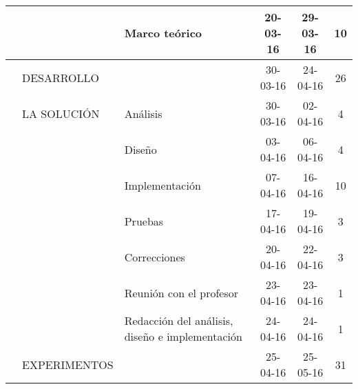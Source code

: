 \begin{table}[H]
{\begin{tabular}{lllccc}
     &				& Marco teórico				& 20-03-16	& 29-03-16	& 10\\\hline
	 & DESARROLLO	&	& 30-03-16	& 24-04-16	& 26\\
     & LA SOLUCIÓN                             & Análisis                                           & 30-03-16                                                           & 02-04-16                                                            & 4                                                                  \\
     &                              & Diseño                                             & 03-04-16                                                           & 06-04-16                                                            & 4                                                                  \\
     &                              & Implementación                                     & 07-04-16                                                           & 16-04-16                                                            & 10                                                                 \\
     &                              & Pruebas                                            & 17-04-16                                                           & 19-04-16                                                            & 3                                                                  \\
     &                               & Correcciones                                       & 20-04-16                                                           & 22-04-16                                                            & 3                                                                  \\
     &                               & Reunión con el profesor                            & 23-04-16                                                           & 23-04-16                                                            & 1                                                                  \\
     &                               & Redacción del análisis, diseño e implementación    & 24-04-16                                                           & 24-04-16                                                            & 1                                                                  \\ \hline
     & EXPERIMENTOS                  &                                                    & 25-04-16                                                           & 25-05-16                                                            & 31                                                                 \\

\end{tabular}}
\end{table}
